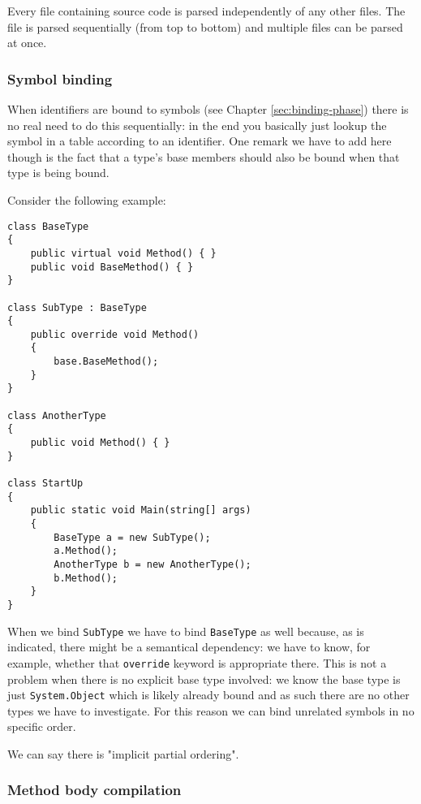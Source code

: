 Every file containing source code is parsed independently of any other files. The file is parsed sequentially (from top to bottom) and multiple files can be parsed at once.\parencite{Sadov2014}

\subsubsection{Symbol binding }
\label{sec:concur-symbol-binding}

When identifiers are bound to symbols (see Chapter \ref{sec:binding-phase}) there is no real need to do this sequentially: in the end you basically just lookup the symbol in a table according to an identifier. One remark we have to add here though is the fact that a type's base members should also be bound when that type is being bound.

Consider the following example:

\begin{lstlisting}
class BaseType
{
	public virtual void Method() { }
	public void BaseMethod() { }	
}

class SubType : BaseType
{
	public override void Method()
	{
		base.BaseMethod();
	}
}

class AnotherType
{
	public void Method() { }
}

class StartUp 
{
	public static void Main(string[] args)
	{
		BaseType a = new SubType();
		a.Method();
		AnotherType b = new AnotherType();
		b.Method();
	}
}
\end{lstlisting}

When we bind \verb|SubType| we have to bind \verb|BaseType| as well because, as is indicated, there might be a semantical dependency: we have to know, for example, whether that \verb|override| keyword is appropriate there. This is not a problem when there is no explicit base type involved: we know the base type is just \verb|System.Object| which is likely already bound and as such there are no other types we have to investigate. For this reason we can bind unrelated symbols in no specific order.

\noindent We can say there is "implicit partial ordering".\parencite{Sadov2014}

\subsubsection{Method body compilation }
\label{sec:concur-symbol-binding}

